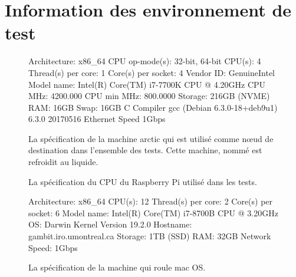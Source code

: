 \chapter{Information des environnement de test}
\label{ch:annexeA}

\begin{figure}[ht]
  \centering
\begin{mplisting}{1}
Architecture:          x86_64
CPU op-mode(s):        32-bit, 64-bit
CPU(s):                4
Thread(s) per core:    1
Core(s) per socket:    4
Vendor ID:             GenuineIntel
Model name:            Intel(R) Core(TM) i7-7700K CPU @ 4.20GHz
CPU MHz:               4200.000
CPU min MHz:           800.0000
Storage:               216GB (NVME)
RAM:                   16GB
Swap:                  16GB
C Compiler             gcc (Debian 6.3.0-18+deb9u1) 6.3.0 20170516
Ethernet Speed         1Gbps
\end{mplisting}
  \caption{La spécification de la machine arctic qui est utilisé comme nœud de destination dans
  l'ensemble des tests. Cette machine, nommé \MMM[x86/Linux] est refroidit au liquide.}
\end{figure}

\begin{figure}[ht]
  \caption{La spécification du CPU du Raspberry Pi  utilisé dans
    les tests.}
\end{figure}

\begin{figure}[ht]
  \begin{mplisting}{1}
Architecture:        x86_64
CPU(s):              12
Thread(s) per core:  2
Core(s) per socket:  6
Model name:          Intel(R) Core(TM) i7-8700B CPU @ 3.20GHz
OS:                  Darwin Kernel Version 19.2.0
Hostname:            gambit.iro.umontreal.ca
Storage:             1TB (SSD)
RAM:                 32GB
Network Speed:       1Gbps
\end{mplisting}
  \caption{La spécification de la machine \MMM[x86/macOS] qui roule mac OS.}
\end{figure}
